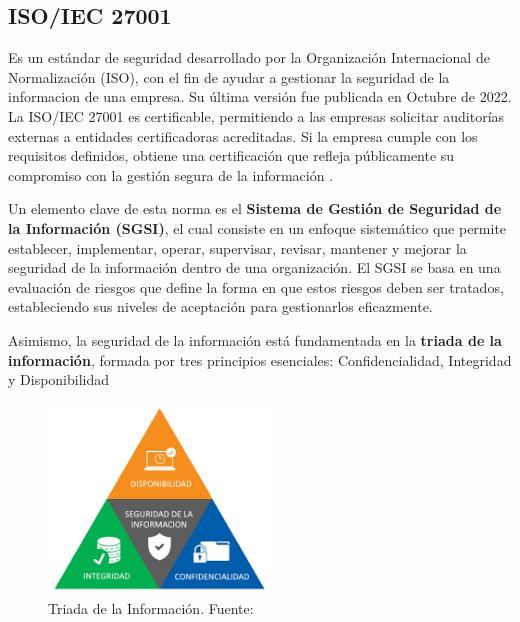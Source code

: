 \documentclass[a4paper, 10pt]{article}
\begin{document}
\par\vspace{0.5cm}


\subsection*{ISO/IEC 27001}
 Es un estándar de seguridad desarrollado por la Organización Internacional de Normalización (ISO), con el fin de ayudar a gestionar la seguridad de la informacion de una empresa. Su última versión fue publicada en Octubre de 2022. La ISO/IEC 27001 es certificable, permitiendo a las empresas solicitar auditorías externas a entidades certificadoras acreditadas. Si la empresa cumple con los requisitos definidos, obtiene una certificación que refleja públicamente su compromiso con la gestión segura de la información \cite{iso27001}.
\par\vspace{0.5cm}
Un elemento clave de esta norma es el \textbf{Sistema de Gestión de Seguridad de la Información (SGSI)}, el cual consiste en un enfoque sistemático que permite establecer, implementar, operar, supervisar, revisar, mantener y mejorar la seguridad de la información dentro de una organización. El SGSI se basa en una evaluación de riesgos que define la forma en que estos riesgos deben ser tratados, estableciendo sus niveles de aceptación para gestionarlos eficazmente.
\par\vspace{0.5cm}

Asimismo, la seguridad de la información está fundamentada en la \textbf{triada de la información}, formada por tres principios esenciales: Confidencialidad, Integridad y Disponibilidad

\begin{figure}[H]
    \centering
    \includegraphics[width=6cm]{images/triada.png}
    \caption{Triada de la Información. Fuente: \cite{triada}} %
    \label{fig:triada}
\end{figure}
\end{document}
